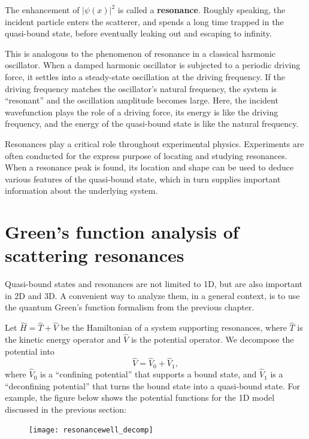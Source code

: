 \documentclass[pra,12pt]{revtex4}
\begin{document}
\noindent
The enhancement of $|\psi(x)|^2$ is called a \textbf{resonance}.
Roughly speaking, the incident particle enters the scatterer, and
spends a long time trapped in the quasi-bound state, before eventually
leaking out and escaping to infinity.

This is analogous to the phenomenon of resonance in a classical
harmonic oscillator.  When a damped harmonic oscillator is subjected
to a periodic driving force, it settles into a steady-state
oscillation at the driving frequency.  If the driving frequency
matches the oscillator's natural frequency, the system is ``resonant''
and the oscillation amplitude becomes large.  Here, the incident
wavefunction plays the role of a driving force, its energy is like the
driving frequency, and the energy of the quasi-bound state is like the
natural frequency.

Resonances play a critical role throughout experimental physics.
Experiments are often conducted for the express purpose of locating
and studying resonances.  When a resonance peak is found, its location
and shape can be used to deduce various features of the quasi-bound
state, which in turn supplies important information about the
underlying system.

\section{Green's function analysis of scattering resonances}
\label{sec:green_resonances}

Quasi-bound states and resonances are not limited to 1D, but are also
important in 2D and 3D.  A convenient way to analyze them, in a
general context, is to use the quantum Green's function formalism from
the previous chapter.

Let $\hat{H} = \hat{T} + \hat{V}$ be the Hamiltonian of a system
supporting resonances, where $\hat{T}$ is the kinetic energy operator
and $\hat{V}$ is the potential operator.  We decompose the potential
into
\begin{equation}
  \hat{V} = \hat{V}_0 + \hat{V}_1,
\end{equation}
where $\hat{V}_0$ is a ``confining potential'' that supports a bound
state, and $\hat{V}_1$ is a ``deconfining potential'' that turns the
bound state into a quasi-bound state.  For example, the figure below
shows the potential functions for the 1D model discussed in the
previous section:

\begin{figure}[h]
  \centering\texttt{[image: resonancewell\_decomp]}
\end{figure}
\end{document}

